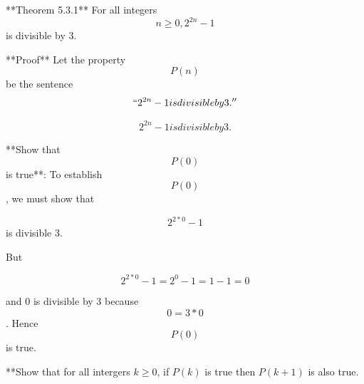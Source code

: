\documentclass[12pt]{article}
\begin{document}
**Theorem 5.3.1**
For all integers $$ n ≥ 0, 2^{2n} - 1 $$ is divisible by 3.

**Proof**
Let the property $$ P(n) $$ be the sentence $$ ``2^{2n} - 1 is divisible by 3. ''$$

$$ 2^{2n} - 1 is divisible by 3. $$

**Show that $$ P(0) $$ is true**:
To establish $$ P(0) $$, we must show that

$$ 2^{2 * 0} -1 $$ is divisible 3.

But

$$ 2^{2*0} - 1 = 2^0 - 1 = 1 - 1 = 0 $$

and 0 is divisible by 3 because $$ 0 = 3 * 0 $$. Hence $$ P(0) $$ is true.

**Show that for all intergers $ k ≥ 0 $, if $P(k)$ is true then $P(k + 1)$ is also true.
\end{document}
